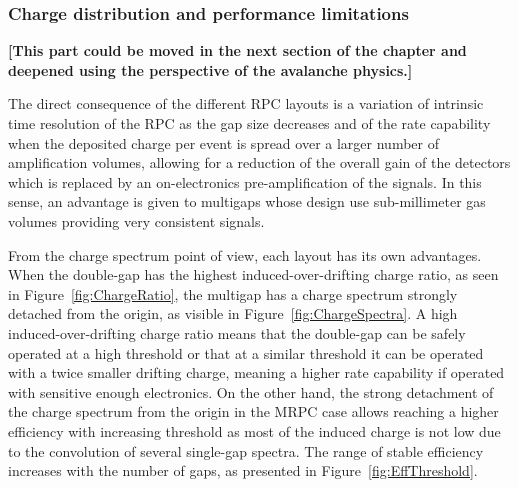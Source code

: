 		\subsubsection{Charge distribution and performance limitations}
		\label{chapt4:sssec:charge}
		
	{\color{blue}\textbf{[This part could be moved in the next section of the chapter and deepened using the perspective of the avalanche physics.]}}
		
	The direct consequence of the different RPC layouts is a variation of intrinsic time resolution of the RPC as the gap size decreases and of the rate capability when the deposited charge per event is spread over a larger number of amplification volumes, allowing for a reduction of the overall gain of the detectors which is replaced by an on-electronics pre-amplification of the signals. In this sense, an advantage is given to multigaps whose design use sub-millimeter gas volumes providing very consistent signals.
	
	From the charge spectrum point of view, each layout has its own advantages. When the double-gap has the highest induced-over-drifting charge ratio, as seen in Figure~\ref{fig:ChargeRatio}, the multigap has a charge spectrum strongly detached from the origin, as visible in Figure~\ref{fig:ChargeSpectra}. A high induced-over-drifting charge ratio means that the double-gap can be safely operated at a high threshold or that at a similar threshold it can be operated with a twice smaller drifting charge, meaning a higher rate capability if operated with sensitive enough electronics. On the other hand, the strong detachment of the charge spectrum from the origin in the MRPC case allows reaching a higher efficiency with increasing threshold as most of the induced charge is not low due to the convolution of several single-gap spectra. The range of stable efficiency increases with the number of gaps, as presented in Figure~\ref{fig:EffThreshold}.
	
